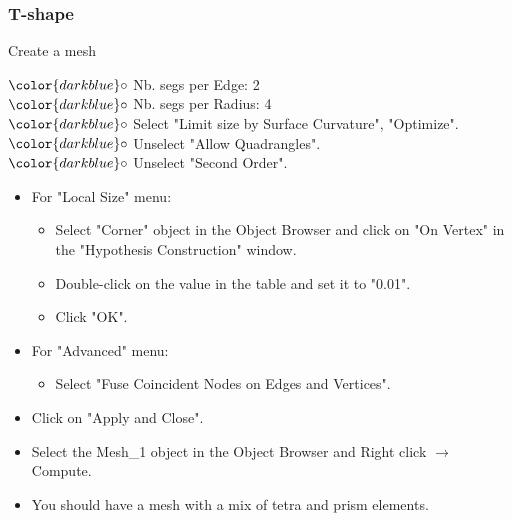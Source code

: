 \documentclass[10pt, hyperref={unicode=true,pdfusetitle, bookmarks=true,bookmarksnumbered=false,bookmarksopen=false, breaklinks=false,pdfborder={0 0l 1},backref=true,colorlinks=true,linkcolor=darkblue,pageanchor}]{beamer}
\begin{document}
\begin{frame}
\frametitle{T-shape}
\begin{block}{Create a mesh}

\hspace{1cm} $\color{darkblue}\circ$ {\small{Nb. segs per Edge: 2}}\\
\hspace{1cm} $\color{darkblue}\circ$ {\small{Nb. segs per Radius: 4}}\\
\hspace{1cm} $\color{darkblue}\circ$ {\small{Select "Limit size by Surface Curvature", "Optimize".}}\\
\hspace{1cm} $\color{darkblue}\circ$ {\small{Unselect "Allow Quadrangles".}}\\
\hspace{1cm} $\color{darkblue}\circ$ {\small{Unselect "Second Order".}}\\

\begin{itemize}
\item For "Local Size" menu:
    \begin{itemize}
    \item [$\circ$] Select "Corner" object in the Object Browser and click on "On Vertex" in the "Hypothesis Construction" window.
    \item [$\circ$] Double-click on the value in the table and set it to "0.01".
    \item [$\circ$] Click "OK".
    \end{itemize}
\item For "Advanced" menu:
    \begin{itemize}
    \item [$\circ$] Select "Fuse Coincident Nodes on Edges and Vertices".
    \end{itemize}
\item Click on "Apply and Close".
\item Select the Mesh\_1 object in the Object Browser and Right click $\rightarrow$ Compute.
\item You should have a mesh with a mix of tetra and prism elements.

\end{itemize}

\end{block}
\end{frame}
\end{document}
